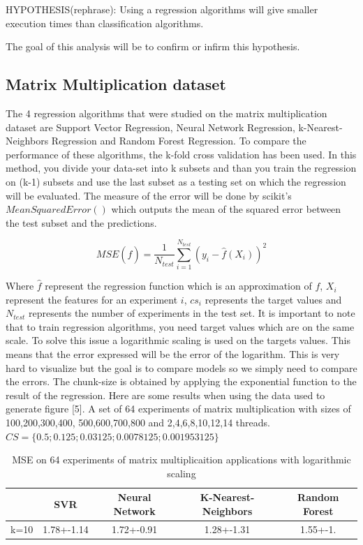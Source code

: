 \documentclass[12pt]{article}
\begin{document}
 HYPOTHESIS(rephrase): Using a regression algorithms will give smaller execution times than classification algorithms.
 
  The goal of this analysis will be to confirm or infirm this hypothesis.


\subsection{Matrix Multiplication dataset}

The 4 regression algorithms that were studied on the matrix multiplication dataset are Support Vector Regression, Neural Network Regression, k-Nearest-Neighbors Regression and Random Forest Regression. To compare the performance of these algorithms, the k-fold cross validation has been used. In this method, you divide your data-set into k subsets and than you train the regression on (k-1) subsets and use the last subset as a testing set on which the regression will be evaluated. The measure of the error will be done by scikit's $MeanSquaredError()$ which outputs the mean of the squared error between the test subset and the predictions.

$$MSE(\hat{f})=\frac{1}{N_{test}}\sum_{i=1}^{N_{test}}(y_i-\hat{f}(X_i))^2$$

Where $\hat{f}$ represent the regression function which is an approximation of $f$, $X_i$ represent the features for an experiment $i$, $cs_i$ represents the target values and $N_{test}$ represents the number of experiments in the test set. It is important to note that to train regression algorithms, you need target values which are on the same scale. To solve this issue a logarithmic scaling is used on the targets values. This means that the error expressed will be the error of the logarithm. This is very hard to visualize but the goal is to compare models so we simply need to compare the errors. The chunk-size is obtained by applying the exponential function to the result of the regression.
Here are some results when using the data used to generate  figure [5]. A set of 64 experiments of matrix multiplication with sizes of 100,200,300,400, 500,600,700,800 and 2,4,6,8,10,12,14 threads.$CS=\{0.5;0.125;0.03125;0.0078125;0.001953125\}$

\begin{table}[h]
	\centering
	\caption{MSE on 64 experiments of matrix multiplicaition applications with logarithmic scaling }
	\label{my-label}
	\begin{tabular}{|c|c|c|c|c|}
		\hline
		& SVR           & Neural Network & K-Nearest-Neighbors & Random Forest \\ \hline
		k=10 & 1.78+-1.14  & 1.72+-0.91    & 1.28+-1.31        & 1.55+-1. \\ \hline
	\end{tabular}
\end{table}
\end{document}
